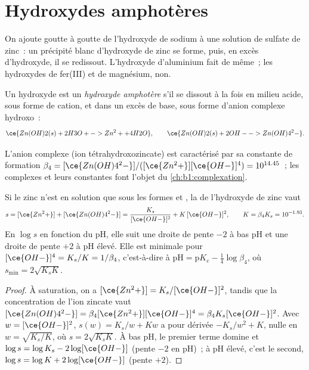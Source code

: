 \section{Hydroxydes amphotères}\label{sec:b1:precipitation:amphoteric}

On ajoute goutte à goutte de l'hydroxyde de sodium à une solution de
sulfate de zinc~: un précipité blanc d'hydroxyde de zinc se forme, puis,
en excès d'hydroxyde, il se redissout. L'hydroxyde d'aluminium fait de
même~; les hydroxydes de fer(III) et de magnésium, non.

\begin{definition}\label{def:b1:precipitation:amphoteric-hydroxide}
Un hydroxyde est un \emph{hydroxyde amphotère}
s'il se dissout à la fois en milieu acide, sous forme de cation, et dans
un excès de base, sous forme d'anion complexe hydroxo~:
\[
  \ce{Zn(OH)2(s) + 2H3O+ -> Zn^2+ + 4H2O}, \qquad
  \ce{Zn(OH)2(s) + 2OH- -> Zn(OH)4^2-} .
\]
\end{definition}

L'anion complexe  (ion tétrahydroxozincate) est
caractérisé par sa constante de formation
$\beta_4 = [\ce{Zn(OH)4^2-}]/([\ce{Zn^2+}][\ce{OH-}]^4)
= 10^{14.45}$~; les complexes et leurs constantes font l'objet du
\cref{ch:b1:complexation}.

\begin{proposition}\label{prop:b1:precipitation:amphoteric}
Si le zinc n'est en solution que sous les formes  et
, la  de l'hydroxyde de zinc vaut
\[
  s = [\ce{Zn^2+}] + [\ce{Zn(OH)4^2-}] = \frac{K_s}{[\ce{OH-}]^2} + K\,[\ce{OH-}]^2,
  \qquad K = \beta_4 K_s = 10^{-1.93} .
\]
En $\log s$ en fonction du pH, elle suit une droite de pente $-2$ à bas
pH et une droite de pente $+2$ à pH élevé. Elle est minimale pour
$[\ce{OH-}]^4 = K_s/K = 1/\beta_4$, c'est-à-dire à $\mathrm{pH} =
\mathrm{p}K_e - \frac14\log\beta_4$, où $s_{\min} = 2\sqrt{K_s K}$.
\end{proposition}

\begin{proof}
À saturation, on a $[\ce{Zn^2+}] = K_s/[\ce{OH-}]^2$, tandis que la
concentration de l'ion zincate vaut
$[\ce{Zn(OH)4^2-}] = \beta_4[\ce{Zn^2+}][\ce{OH-}]^4 = \beta_4 K_s
[\ce{OH-}]^2$. Avec $w = [\ce{OH-}]^2$, $s(w) = K_s/w + Kw$ a pour dérivée
$-K_s/w^2 + K$, nulle en $w = \sqrt{K_s/K}$, où $s = 2\sqrt{K_s K}$. À
bas pH, le premier terme domine et $\log s = \log K_s - 2\log[\ce{OH-}]$
(pente $-2$ en pH)~; à pH élevé, c'est le second,
$\log s = \log K + 2\log[\ce{OH-}]$ (pente $+2$).
\end{proof}

